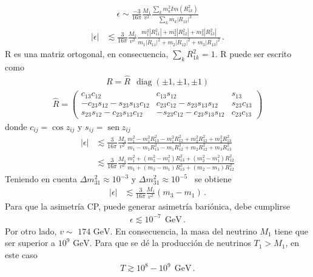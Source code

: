 \begin{align}
\epsilon\sim\frac{-3}{16\pi}\frac{M_{1}}{v^2}\frac{\sum_{k}m^2_{k}Im(R_{1k}^2)}{\sum_{k}m_{k}|R_{1k}|^2}
\end{align}
\begin{align}
|\epsilon|&\lesssim\frac{3}{16\pi}\frac{M_{1}}{v^2}\frac{m_{1}^2|R_{11}^2|+m_{2}^2|R_{12}^2|+m_{3}^2|R_{13}^2|}{m_{1}|R_{11}|^2+m_{2}|R_{12}|^2+m_{3}|R_{13}|^2}\, . 
\end{align}
R es una matriz ortogonal, en consecuencia, $\sum_{k}R_{1k}^{2}=1$. R puede ser escrito como 
\begin{align}
R=\hat{R}\ \ \operatorname{diag}(\pm 1,\pm 1,\pm 1)
\end{align}
\begin{align}
\hat{R}=\begin{pmatrix}c_{13}c_{12}&c_{13}s_{12}&s_{13}\\-c_{23}s_{12}-s_{23}s_{13}c_{12}&c_{23}c_{12}-s_{23}s_{13}s_{12}&s_{23}c_{13}\\s_{23}s_{12}-c_{23}s_{13}c_{12}&-s_{23}c_{12}-c_{23}s_{13}s_{12}&c_{23}c_{13}  \end{pmatrix}
\end{align}
donde $c_{ij}=\cos{z_{ij}}$ y $s_{ij}=\operatorname{sen}{z_{ij}}$
\begin{align}
|\epsilon|&\lesssim\frac{3}{16\pi}\frac{M_{1}}{v^2}\frac{m_{1}^2-m_{1}^2R_{13}^2-m_{1}^2R_{12}^2+m_{2}^2R_{12}^2+m_{3}^2R_{13}^2}{m_{1}-m_{1}R_{13}^2-m_{1}R_{12}^2+m_{2}R_{12}^2+m_{3}R_{13}^2}\nonumber \\
&\lesssim\frac{3}{16\pi}\frac{M_{1}}{v^2}\frac{m_{1}^2+(m_{3}^2-m_{1}^2)R_{13}^2+(m_{2}^2-m_{1}^2)R_{12}^2}{m_{1}+(m_{3}-m_{1})R_{13}^2+(m_{2}-m_{1})R_{12}^2}\nonumber
\end{align} 
Teniendo en cuenta $\Delta m_{31}^{2}\approx 10^{-3}$ y $\Delta m_{31}^{2}\approx 10^{-5}$~\cite{GonzalezGarcia:2012sz} se obtiene
\begin{align}
|\epsilon|&\lesssim\frac{3}{16\pi}\frac{M_{1}}{v^2}(m_{3}-m_{1})\, . 
\end{align}
Para que la asimetría CP, puede generar asimetría bariónica, debe cumplirse 
\begin{align}
\epsilon\lesssim10^{-7} \ \ \text{GeV}\, . 
\end{align}
Por otro lado, $v\sim$ $174$ $\text{GeV}$. En consecuencia, la masa del neutrino $M_{1}$ tiene que ser superior a $10^{9}$ $\text{GeV}$. Para que se dé la producción de neutrinos $T_{1}>M_{1}$, en este caso 
\begin{align}
\label{bario}
T\gtrsim10^{8}-10^{9} \ \ \text{GeV}\, . 
\end{align}
